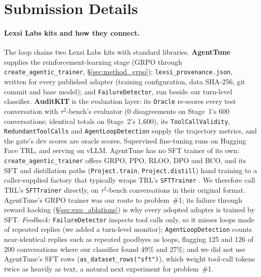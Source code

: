 \documentclass[11pt]{article}
\begin{document}
\section{Submission Details}
\label{app:submission}

\paragraph{Lexsi Labs kits and how they connect.} The loop chains two Lexsi Labs kits with standard libraries. \textbf{AgentTune} \citep{Lyngkhoi2026AgentTune} supplies the reinforcement-learning stage (GRPO through \texttt{create\_agentic\_trainer}, \S\ref{sec:method_grpo}); \texttt{lexsi\_provenance.json}, written for every published adapter (training configuration, data SHA-256, git commit and base model); and \texttt{FailureDetector}, run beside our turn-level classifier. \textbf{AuditKIT} \citep{Arora2026AuditKIT} is the evaluation layer: its \texttt{Oracle} re-scores every test conversation with $\tau^2$-bench's evaluator (0 disagreements on Stage~1's 600 conversations; identical totals on Stage~2's 1,600), its \texttt{ToolCallValidity}, \texttt{RedundantToolCalls} and \texttt{AgentLoopDetection} supply the trajectory metrics, and the gate's dev scores are oracle scores. Supervised fine-tuning runs on Hugging Face TRL, and serving on vLLM. AgentTune has no SFT trainer of its own: \texttt{create\_agentic\_trainer} offers GRPO, PPO, RLOO, DPO and BCO, and its SFT and distillation paths (\texttt{Project.train}, \texttt{Project.distill}) hand training to a caller-supplied factory that typically wraps TRL's \texttt{SFTTrainer} \citep{Lyngkhoi2026AgentTune}. We therefore call TRL's \texttt{SFTTrainer} directly, on $\tau^2$-bench conversations in their original format. AgentTune's GRPO trainer was our route to problem~\#1; its failure through reward hacking (\S\ref{sec:exp_ablations}) is why every adopted adapter is trained by SFT. \emph{Feedback:} \texttt{FailureDetector} inspects tool calls only, so it misses loops made of repeated replies (we added a turn-level monitor); \texttt{AgentLoopDetection} counts near-identical replies such as repeated goodbyes as loops, flagging 125 and 126 of 200 conversations where our classifier found 49\% and 27\%; and we did not use AgentTune's SFT rows (\texttt{as\_dataset\_rows("sft")}), which weight tool-call tokens twice as heavily as text, a natural next experiment for problem~\#1.
\end{document}
